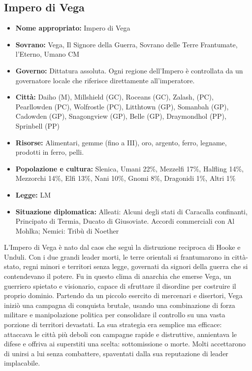 \documentclass[10pt, a4paper]{report}
\begin{document}
\begin{multicols}{2}
\subsection*{Impero di Vega}
\begin{itemize}
	\item \textbf{Nome appropriato:} Impero di Vega
	\item \textbf{Sovrano:} Vega, Il Signore della Guerra, Sovrano delle Terre Frantumate, l'Eterno, Umano CM
	\item \textbf{Governo:} Dittatura assoluta. Ogni regione dell’Impero è controllata da un governatore locale che riferisce direttamente all'imperatore.
	\item \textbf{Città:} Daiho (M), Millshield (GC), Roceans (GC), Zalash, (PC), Pearllowden (PC), Wolfrostle (PC), Litthtown (GP), Somanbah (GP), Cadowden (GP), Snagongview (GP), Belle (GP), Draymondhol (PP), Sprinbell (PP)
	\item \textbf{Risorse:} Alimentari, gemme (fino a III), oro, argento, ferro, legname, prodotti in ferro, pelli.
	\item \textbf{Popolazione e cultura:} Slenica, Umani 22\%, Mezzelfi 17\%, Halfling 14\%, Mezzorchi 14\%, Elfi 13\%, Nani 10\%, Gnomi 8\%, Dragonidi 1\%, Altri 1\%
	\item \textbf{Legge:} LM
	\item \textbf{Situazione diplomatica:} Alleati: Alcuni degli stati di Caracalla confinanti, Principato di Termia, Ducato di Giusoviate. Accordi commerciali con Al Mohlka; Nemici: Tribù di Noether	
\end{itemize}
L’Impero di Vega è nato dal caos che seguì la distruzione reciproca di Hooke e Unduli. Con i due grandi leader morti, le terre orientali si frantumarono in città-stato, regni minori e territori senza legge, governati da signori della guerra che si contendevano il potere. Fu in questo clima di anarchia che emerse Vega, un guerriero spietato e visionario, capace di sfruttare il disordine per costruire il proprio dominio. Partendo da un piccolo esercito di mercenari e disertori, Vega iniziò una campagna di conquista brutale, usando una combinazione di forza militare e manipolazione politica per consolidare il controllo su una vasta porzione di territori devastati. La sua strategia era semplice ma efficace: attaccava le città più deboli con campagne rapide e distruttive, annientava le difese e offriva ai superstiti una scelta: sottomissione o morte. Molti accettarono di unirsi a lui senza combattere, spaventati dalla sua reputazione di leader implacabile.

\end{multicols}
\end{document}
